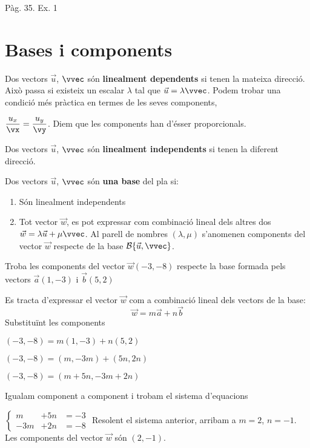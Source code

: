 \documentclass[11pt, a4paper, pdf]{article}
\renewcommand{\hot}[1][]{
	\ifthenelse{\equal{#1}{}}{$\mathbf{\bigstar}$ LLIBRE $\mathbf{\bigstar}$: }{\myrepeat{#1}{$\mathbf{\bigstar}$}}
}
\begin{document}
\hot Pàg. 35. Ex. 1
  
 
 \section{Bases i components}
 
 
 
 \begin{theorybox}
 	Dos vectors $\vec u$, $\vvec$ són \textbf{linealment dependents} si tenen la mateixa direcció. Això passa si existeix un escalar $\lambda$ tal que $\vec u = \lambda \vvec$. Podem trobar una condició més pràctica en termes de les seves components, 
 	
  	$\dfrac{u_x}{\vx} = \dfrac{u_y}{\vy}$. Diem que les components han d'ésser proporcionals.
 	
 	Dos vectors $\vec u$, $\vvec$ són \textbf{linealment independents} si tenen la diferent direcció. 
 \end{theorybox}
 
  
 
 \begin{theorybox}
 	Dos vectors $\vec u$, $\vvec$ són  \textbf{una base} del pla si: 
 	\begin{enumerate}
 		\item Són linealment independents
 		\item Tot vector $\vec w$, es pot expressar com combinació lineal dels altres dos $\vec w = \lambda \vec u + \mu \vvec$. Al parell de nombres $(\lambda, \mu)$ s'anomenen components del vector $\vec w$ respecte de la base $\mathcal{B}\{\vec u, \vvec\}$.
 	\end{enumerate} 
 \end{theorybox}
 
 \begin{resolt}{Troba les components del vector $\vec w(-3,-8)$ respecte la base formada pels vectors $\vec a(1,-3)$ i $\vec b(5,2)$}
 	
 	Es tracta d'expressar el vector $\vec w$ com a combinació lineal dels vectors de la base:
 	\begin{equation*}
 	\vec w = m \vec a + n \vec b
 	\end{equation*}
 	Substituïnt les components
 	
 	$(-3,-8)=m(1,-3)+n(5,2)$
 	
 	$(-3,-8)=(m,-3m)+(5n,2n)$
 	
 	$(-3,-8)=(m+5n,-3m+2n)$
 	
 	Igualam component a component i trobam el sistema d'equacions
 	
 	$\left\{\begin{array}{lll}
 	m &+5n &=-3 \\
 	-3m&+2n&=-8
 	\end{array}\right.$
 	Resolent el sistema anterior, arribam \linebreak a $m=2$, $n=-1$. Les components del vector $\vec w$ són $(2,-1)$.
 \end{resolt}
 
\end{document}
